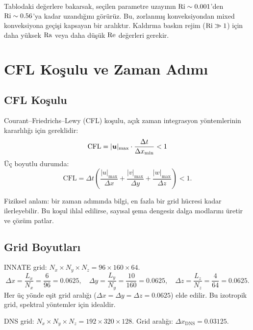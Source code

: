 Tablodaki değerlere bakarsak, seçilen parametre uzayının $\mathrm{Ri} \sim 0.001$'den $\mathrm{Ri} \sim 0.56$'ya kadar uzandığını görürüz. Bu, zorlanmış konveksiyondan mixed konveksiyona geçişi kapsayan bir aralıktır. Kaldırma baskın rejim ($\mathrm{Ri} \gg 1$) için daha yüksek $\mathrm{Ra}$ veya daha düşük $\mathrm{Re}$ değerleri gerekir.


\section{CFL Koşulu ve Zaman Adımı}
\label{sec:cfl}

\subsection{CFL Koşulu}

Courant--Friedrichs--Lewy (CFL) koşulu, açık zaman integrasyon yöntemlerinin kararlılığı için gereklidir:
\begin{equation}
    \mathrm{CFL} = |\bm{u}|_{\max} \cdot \frac{\Delta t}{\Delta x_{\min}} < 1
    \label{eq:cfl}
\end{equation}
Üç boyutlu durumda:
\begin{equation}
    \mathrm{CFL} = \Delta t \left(\frac{|u|_{\max}}{\Delta x} + \frac{|v|_{\max}}{\Delta y} + \frac{|w|_{\max}}{\Delta z}\right) < 1.
    \label{eq:cfl_3d}
\end{equation}

Fiziksel anlam: bir zaman adımında bilgi, en fazla bir grid hücresi kadar ilerleyebilir. Bu koşul ihlal edilirse, sayısal şema dengesiz dalga modlarını üretir ve çözüm patlar.

\subsection{Grid Boyutları}

INNATE grid: $N_x \times N_y \times N_z = 96 \times 160 \times 64$.
\begin{equation}
    \Delta x = \frac{L_x}{N_x} = \frac{6}{96} = 0.0625, \quad
    \Delta y = \frac{L_y}{N_y} = \frac{10}{160} = 0.0625, \quad
    \Delta z = \frac{L_z}{N_z} = \frac{4}{64} = 0.0625.
    \label{eq:grid_spacing}
\end{equation}
Her üç yönde eşit grid aralığı ($\Delta x = \Delta y = \Delta z = 0.0625$) elde edilir. Bu izotropik grid, spektral yöntemler için idealdir.

DNS grid: $N_x \times N_y \times N_z = 192 \times 320 \times 128$. Grid aralığı: $\Delta x_{\text{DNS}} = 0.03125$.

